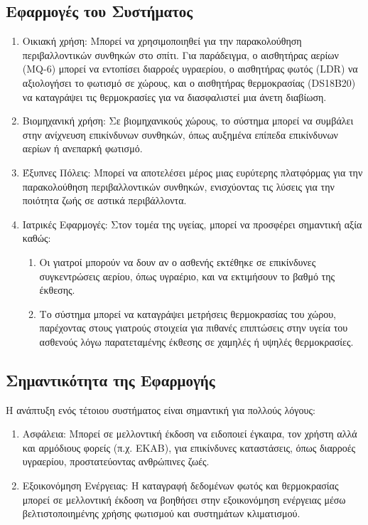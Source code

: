 \documentclass[conference]{IEEEtran}
\begin{document}
\subsection{Εφαρμογές του Συστήματος}
\begin{enumerate}
	\item Οικιακή χρήση: Μπορεί να χρησιμοποιηθεί για την παρακολούθηση περιβαλλοντικών συνθηκών στο σπίτι. Για παράδειγμα, ο αισθητήρας αερίων (MQ-6) μπορεί να εντοπίσει διαρροές υγραερίου, ο αισθητήρας φωτός (LDR) να αξιολογήσει το φωτισμό σε χώρους, και ο αισθητήρας θερμοκρασίας (DS18B20) να καταγράψει τις θερμοκρασίες για να διασφαλιστεί μια άνετη διαβίωση.
	\item Βιομηχανική χρήση: Σε βιομηχανικούς χώρους, το σύστημα μπορεί να συμβάλει στην ανίχνευση επικίνδυνων συνθηκών, όπως αυξημένα επίπεδα επικίνδυνων αερίων ή ανεπαρκή φωτισμό.
	\item Έξυπνες Πόλεις: Μπορεί να αποτελέσει μέρος μιας ευρύτερης πλατφόρμας για την παρακολούθηση περιβαλλοντικών συνθηκών, ενισχύοντας τις λύσεις για την ποιότητα ζωής σε αστικά περιβάλλοντα.
	\item Ιατρικές Εφαρμογές: Στον τομέα της υγείας, μπορεί να προσφέρει σημαντική αξία καθώς:
	      \begin{enumerate}
	      	\item Οι γιατροί μπορούν να δουν αν ο ασθενής εκτέθηκε σε επικίνδυνες συγκεντρώσεις αερίου, όπως υγραέριο, και να εκτιμήσουν το βαθμό της έκθεσης.
	      	\item Το σύστημα μπορεί να καταγράψει μετρήσεις θερμοκρασίας του χώρου, παρέχοντας στους γιατρούς στοιχεία για πιθανές επιπτώσεις στην υγεία του ασθενούς λόγω παρατεταμένης έκθεσης σε χαμηλές ή υψηλές θερμοκρασίες.
	      \end{enumerate}	
\end{enumerate}

\subsection{Σημαντικότητα της Εφαρμογής}
Η ανάπτυξη ενός τέτοιου συστήματος είναι σημαντική για πολλούς λόγους:
\begin{enumerate}
	\item Ασφάλεια: Μπορεί σε μελλοντική έκδοση να ειδοποιεί έγκαιρα, τον χρήστη αλλά και αρμόδιους φορείς (π.χ. ΕΚΑΒ), για επικίνδυνες καταστάσεις, όπως διαρροές υγραερίου, προστατεύοντας ανθρώπινες ζωές.
	\item Εξοικονόμηση Ενέργειας: Η καταγραφή δεδομένων φωτός και θερμοκρασίας μπορεί σε μελλοντική έκδοση να βοηθήσει στην εξοικονόμηση ενέργειας μέσω βελτιστοποιημένης χρήσης φωτισμού και συστημάτων κλιματισμού.
\end{enumerate}
\end{document}
